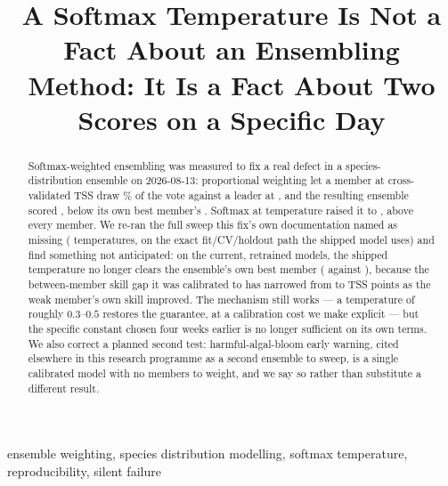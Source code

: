 \documentclass[conference]{IEEEtran}
\begin{document}
\title{A Softmax Temperature Is Not a Fact About an Ensembling Method: It Is
a Fact About Two Scores on a Specific Day}

\author{
}

\maketitle

\begin{abstract}
Softmax-weighted ensembling was measured to fix a real defect in a
species-distribution ensemble on 2026-08-13: proportional weighting let a
member at cross-validated TSS \HistMaxentCV{} draw \HistMaxentVote{}\% of
the vote against a leader at \HistLgbmCV{}, and the resulting ensemble
scored \HistPropTSS{}, below its own best member's \HistBestMemberTSS{}.
Softmax at temperature \ShippedTemperature{} raised it to
\HistSoftmaxTSS{}, above every member. We re-ran the full sweep this fix's
own documentation named as missing (\NSweepPoints{} temperatures, on the
exact fit/CV/holdout path the shipped model uses) and find something not
anticipated: on the current, retrained models, the shipped temperature no
longer clears the ensemble's own best member (\CurShippedTSS{} against
\CurLgbmHoldoutTSS{}), because the between-member skill gap it was
calibrated to has narrowed from \HistGap{} to \CurGap{} TSS points as the
weak member's own skill improved. The mechanism still works --- a
temperature of roughly \(0.3\)--\(0.5\) restores the guarantee, at a
calibration cost we make explicit --- but the specific constant chosen four
weeks earlier is no longer sufficient on its own terms. We also correct a
planned second test: harmful-algal-bloom early warning, cited elsewhere in
this research programme as a second ensemble to sweep, is a single
calibrated model with no members to weight, and we say so rather than
substitute a different result.
\end{abstract}

\begin{IEEEkeywords}
ensemble weighting, species distribution modelling, softmax temperature,
reproducibility, silent failure
\end{IEEEkeywords}


\end{document}
